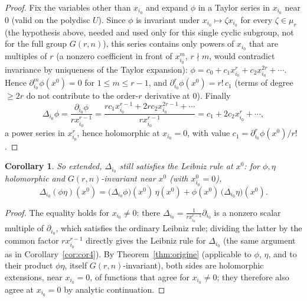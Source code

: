 \documentclass[11pt]{article}
\newtheorem{corollary}[theorem]{Corollary}
\theoremstyle{remark}
\begin{document}
\begin{proof}
Fix the variables other than $x_{i_0}$ and expand $\phi$ in a Taylor series in $x_{i_0}$ near $0$ (valid on the polydisc $U$). Since $\phi$ is invariant under $x_{i_0}\mapsto\zeta x_{i_0}$ for every $\zeta\in\mu_r$ (the hypothesis above, needed and used only for this single cyclic subgroup, not for the full group $G(r,n)$), this series contains only powers of $x_{i_0}$ that are multiples of $r$ (a nonzero coefficient in front of $x_{i_0}^m$, $r\nmid m$, would contradict invariance by uniqueness of the Taylor expansion): $\phi=c_0+c_1x_{i_0}^r+c_2x_{i_0}^{2r}+\cdots$. Hence $\partial_{i_0}^m\phi(x^0)=0$ for $1\le m\le r-1$, and $\partial_{i_0}^r\phi(x^0)=r!\,c_1$ (terms of degree $\ge2r$ do not contribute to the order-$r$ derivative at $0$). Finally
\[
\Delta_{i_0}\phi = \frac{\partial_{i_0}\phi}{rx_{i_0}^{r-1}} = \frac{rc_1x_{i_0}^{r-1}+2rc_2x_{i_0}^{2r-1}+\cdots}{rx_{i_0}^{r-1}} = c_1+2c_2x_{i_0}^r+\cdots,
\]
a power series in $x_{i_0}^r$, hence holomorphic at $x_{i_0}=0$, with value $c_1=\partial_{i_0}^r\phi(x^0)/r!$.
\end{proof}

\begin{corollary}\label{cor:leibniz-origine}
So extended, $\Delta_{i_0}$ still satisfies the Leibniz rule at $x^0$: for $\phi,\eta$ holomorphic and $G(r,n)$-invariant near $x^0$ (with $x_{i_0}^0=0$),
\[
\Delta_{i_0}(\phi\eta)(x^0) = \big(\Delta_{i_0}\phi\big)(x^0)\,\eta(x^0) + \phi(x^0)\,\big(\Delta_{i_0}\eta\big)(x^0).
\]
\end{corollary}

\begin{proof}
The equality holds for $x_{i_0}\ne0$: there $\Delta_{i_0}=\frac{1}{rx_{i_0}^{r-1}}\partial_{i_0}$ is a nonzero scalar multiple of $\partial_{i_0}$, which satisfies the ordinary Leibniz rule; dividing the latter by the common factor $rx_{i_0}^{r-1}$ directly gives the Leibniz rule for $\Delta_{i_0}$ (the same argument as in Corollary~\ref{cor:cor4}). By Theorem~\ref{thm:origine} (applicable to $\phi$, $\eta$, and to their product $\phi\eta$, itself $G(r,n)$-invariant), both sides are holomorphic extensions, near $x_{i_0}=0$, of functions that agree for $x_{i_0}\ne0$; they therefore also agree at $x_{i_0}=0$ by analytic continuation.
\end{proof}
\end{document}
